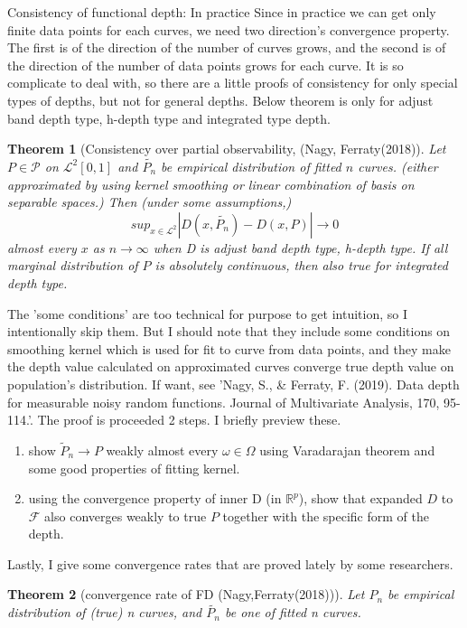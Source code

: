 \documentclass[aspectratio=169,ignorenonframetext,9pt]{beamer}
\theoremstyle{plain}
\newtheorem{thm}{Theorem}[section]
\theoremstyle{definition}
\begin{document}
\begin{frame}{Consistency of functional depth: In practice}
Since in practice we can get only finite data points for each curves, we need two direction's convergence property. 
The first is of the direction of the number of curves grows, and the second is of the direction of the number of data points grows for each curve.
It is so complicate to deal with, so there are a little proofs of consistency for only special types of depths, but not for general depths.
Below theorem is only for adjust band depth type, h-depth type and integrated type depth.

\begin{thm}[Consistency over partial observability, (Nagy, Ferraty(2018)]
    Let $P\in\mathcal{P}$ on $\mathcal{L}^2[0,1]$ and $\tilde{P_n}$ be empirical distribution of fitted $n$ curves.
    (either approximated by using kernel smoothing or linear combination of basis on separable spaces.)
    Then (under some assumptions,)
    \[sup_{x\in\mathcal{L}^2} |D(x,\tilde{P_n})-D(x,P)|\rightarrow 0\]
    almost every $x$ as $n\rightarrow\infty$ when D is adjust band depth type, h-depth type.
    If all marginal distribution of $P$ is absolutely continuous, then also true for integrated depth type.
\end{thm}

The 'some conditions' are too technical for purpose to get intuition, so I intentionally skip them.
But I should note that they include some conditions on smoothing kernel which is used for fit to curve from data points,
and they make the depth value calculated on approximated curves converge true depth value on population's distribution.
If want, see 'Nagy, S., \& Ferraty, F. (2019). Data depth for measurable noisy random functions. Journal of Multivariate Analysis, 170, 95-114.'.
The proof is proceeded 2 steps. I briefly preview these.
\begin{enumerate}
    \item show $\tilde{P}_n\rightarrow P$ weakly almost every $\omega\in\Omega$ using Varadarajan theorem and some good properties of fitting kernel.
    \item using the convergence property of inner D (in $\mathbb{R}^p$),
    show that expanded $D$ to $\mathcal{F}$ also converges weakly to true $P$ together with the specific form of the depth.
\end{enumerate}

Lastly, I give some convergence rates that are proved lately by some researchers.
\begin{thm}[convergence rate of FD (Nagy,Ferraty(2018))]
    Let $P_n$ be empirical distribution of (true) n curves, and $\tilde{P_n}$ be one of fitted n curves.


\end{thm}
\end{frame}
\end{document}
